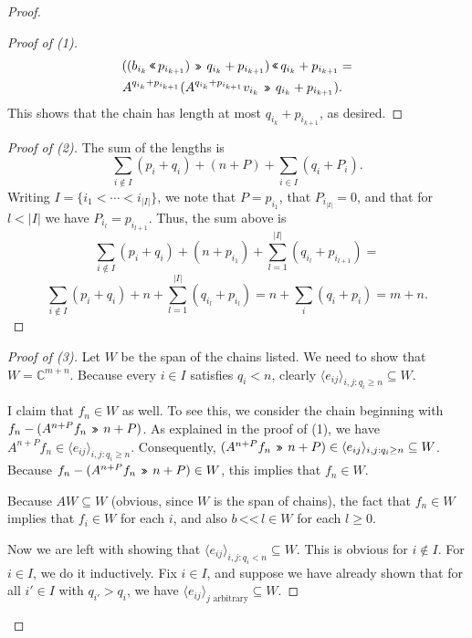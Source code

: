 \documentclass[12pt,psamsfonts]{article}
\newcommand{\leftshift}{\,\texttt{<<}\,}
\newcommand{\rightshift}{\mathbin{\rotatebox[origin=c]{180}{\leftshift}}}
\begin{document}
\begin{proof}
\begin{proof}[Proof of (1)]
\begin{align*}
            ((b_{i_k} \leftshift p_{i_{k + 1}}) \rightshift q_{i_k} + p_{i_{k + 1}}) \leftshift q_{i_k} + p_{i_{k + 1}} & = \\
            A^{q_{i_k} + p_{i_{k + 1}}}(A^{q_{i_k} + p_{i_{k + 1}}} v_{i_k} \rightshift q_{i_k} + p_{i_{k + 1}}) & .
        \end{align*}
        This shows that the chain has length at most \(q_{i_k} + p_{i_{k + 1}}\), as desired.
    \end{proof}
    \begin{proof}[Proof of (2)]
        The sum of the lengths is
        \[\sum_{i \notin I} (p_i + q_i) + (n + P) + \sum_{i \in I} (q_i + P_i).\]
        Writing \(I = \{i_1 < \cdots < i_{|I|}\}\), we note that \(P = p_{i_1}\), that \(P_{i_{|I|}} = 0\), and that for \(l < |I|\) we have \(P_{i_l} = p_{i_{l + 1}}\).
        Thus, the sum above is 
        \[\sum_{i \notin I} (p_i + q_i) + (n + p_{i_1}) + \sum_{l = 1}^{|I|} (q_{i_l} + p_{i_{l + 1}}) = \]
        \[\sum_{i \notin I} (p_i + q_i) + n + \sum_{l = 1}^{|I|} (q_{i_l} + p_{i_l}) = n + \sum_i (q_i + p_i) = m + n.\]
    \end{proof}
    \begin{proof}[Proof of (3)]
        Let \(W\) be the span of the chains listed.
        We need to show that \(W = \mathbb{C}^{m + n}\).
        Because every \(i \in I\) satisfies \(q_i < n\), clearly \(\langle e_{ij}\rangle_{i,j : q_i \geq n} \subseteq W\).
        \par I claim that \(f_n \in W\) as well.
        To see this, we consider the chain beginning with \(f_n - (A^{n + P} f_n \rightshift n + P)\).
        As explained in the proof of (1), we have \(A^{n + P} f_n \in \langle e_{ij}\rangle_{i,j : q_i \geq n}\).
        Consequently, \((A^{n + P} f_n \rightshift n + P) \in \langle e_{ij} \rangle_{i,j : q_i \geq n} \subseteq W\).
        Because \(f_n - (A^{n + P} f_n \rightshift n + P) \in W\), this implies that \(f_n \in W\).
        \par Because \(AW \subseteq W\) (obvious, since \(W\) is the span of chains), the fact that \(f_n \in W\) implies that \(f_i \in W\) for each \(i\), and also \(b \leftshift l \in W\) for each \(l \geq 0\).
        \par Now we are left with showing that \(\langle e_{ij} \rangle_{i,j : q_i < n} \subseteq W\).
        This is obvious for \(i \notin I\).
        For \(i \in I\), we do it inductively.
        Fix \(i \in I\), and suppose we have already shown that for all \(i' \in I\) with \(q_{i'} > q_i\), we have \(\langle e_{ij} \rangle_{j \textrm{ arbitrary}} \subseteq W\).

\end{proof}
\end{proof}
\end{document}
